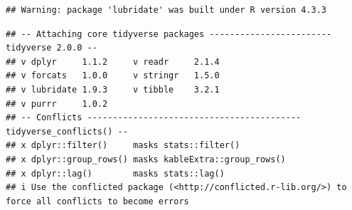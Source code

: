 \documentclass[
]{article}
\begin{document}
\begin{verbatim}
## Warning: package 'lubridate' was built under R version 4.3.3
\end{verbatim}

\begin{verbatim}
## -- Attaching core tidyverse packages ------------------------ tidyverse 2.0.0 --
## v dplyr     1.1.2     v readr     2.1.4
## v forcats   1.0.0     v stringr   1.5.0
## v lubridate 1.9.3     v tibble    3.2.1
## v purrr     1.0.2     
## -- Conflicts ------------------------------------------ tidyverse_conflicts() --
## x dplyr::filter()     masks stats::filter()
## x dplyr::group_rows() masks kableExtra::group_rows()
## x dplyr::lag()        masks stats::lag()
## i Use the conflicted package (<http://conflicted.r-lib.org/>) to force all conflicts to become errors
\end{verbatim}
\end{document}
